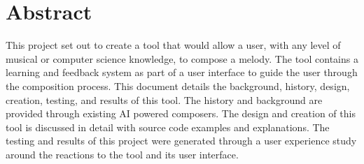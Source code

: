 \chapter*{Abstract} 

This project set out to create a tool that would allow a user, with any level of musical or computer science knowledge, to compose a melody.  The tool contains a learning and feedback system as part of a user interface to guide the user through the composition process.  This document details the background, history, design, creation, testing, and results of this tool.  The history and background are provided through existing AI powered composers.  The design and creation of this tool is discussed in detail with source code examples and explanations.  The testing and results of this project were generated through a user experience study around the reactions to the tool and its user interface.